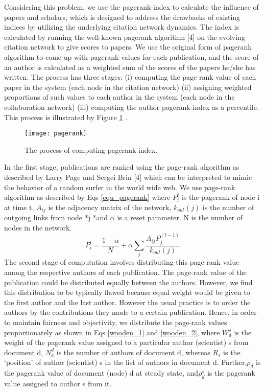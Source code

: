 \documentclass[conference]{IEEEtran}
\begin{document}
Considering this problem, we use the pagerank-index to calculate the influence of papers and scholars, which is designed to address the drawbacks of existing indices by utilizing the underlying citation network dynamics. The index is calculated by running the well-known pagerank algorithm [4] on the evolving citation network to give scores to papers.  We use the original form of pagerank algorithm to come up with pagerank values for each publication, and the score of an author is calculated as a weighted sum of the scores of the papers he/she has written. The process has three stages: (i) computing the page-rank value of each paper in the system (each node in the citation network) (ii) assigning weighted proportions of such values to each author in the system (each node in the collaboration network) (iii) computing the author pagerank-index as a percentile. This process is illustrated by Figure \ref{fig_pagerank} .
\begin{figure}[h]
\centering
\texttt{[image: pagerank]}
\caption{The process of computing pagerank index.}
\label{fig_pagerank}	
\end{figure}
In the first stage, publications are ranked using the page-rank algorithm as described by Larry Page and Sergei Brin [4] which can be interpreted to mimic the behavior of a random surfer in the world wide web. We use page-rank algorithm as described by Eqs \ref{equ_pagerank} where $P_i^t$ is the pagerank of node i at time t, $A_{ij}$ is the adjacency matrix of the network, $k_{out}(j)$ is the number of outgoing links from node *j *and $\alpha$ is a reset parameter. N is the number of nodes in the network.
\begin{equation}
	P_i^t = \frac{1-\alpha}{N}+ \alpha \sum_j \frac{A_{ij}P_j^{(t-1)}}{k_{out}(j)} 
\label{equ_pagerank}
\end{equation}
The second stage of computation involves distributing this page-rank value among the respective authors of each publication. The page-rank value of the publication could be distributed equally between the authors. However, we find this distribution to be typically flawed because equal weight would be given to the first author and the last author. However the usual practice is to order the authors by the contributions they made to a certain publication. Hence, in order to maintain fairness and objectivity, we distribute the page-rank values proportionately as shown in Eqs \ref{wooden_1} and \ref{wooden_2}, where $W_d^s$ is the weight of the pagerank value assigned to a particular author (scientist) s from document d, $N^d_a$  is the number of authors of document d, whereas $R_s$ is the ‘position’ of author (scientist) s in the list of authors in document d. Further,$\rho_d$ is the pagerank value of document (node) d at steady state, and$\rho_d^s$ is the pagerank value assigned to author s from it.
\end{document}

